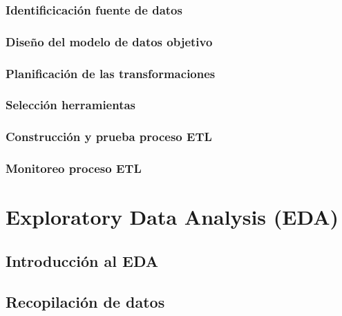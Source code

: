\documentclass[letterpaper, 12pt]{report}
\begin{document}
\subsection{Identificicación fuente de datos}


\subsection{Diseño del modelo de datos objetivo}


\subsection{Planificación de las transformaciones}


\subsection{Selección herramientas}


\subsection{Construcción y prueba proceso ETL}


\subsection{Monitoreo proceso ETL}


\chapter{Exploratory Data Analysis (EDA)}



\section{Introducción al EDA}


\section{Recopilación de datos}

\end{document}
